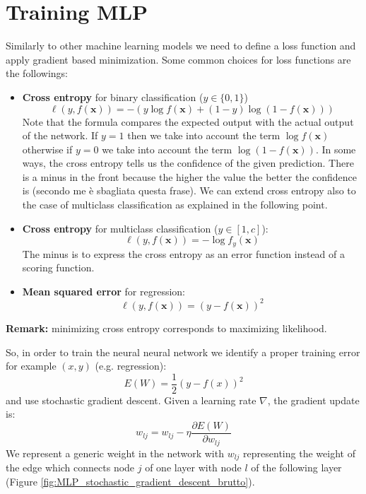 \section{Training MLP}
Similarly to other machine learning models we need to define a loss function and apply gradient based minimization. Some common choices for loss functions are the followings:
\begin{itemize}
    \item \textbf{Cross entropy} for binary classification ($y \in \{0,1\}$)
    \begin{equation}
        \ell(y,f(\pmb{x})) = -(y \log{f(\pmb{x})} + (1-y)\log{(1-f(\pmb{x}))})
    \end{equation}
    Note that the formula compares the expected output with the actual output of the network. If $y=1$ then we take into account the term $\log{f(\pmb{x})}$ otherwise if $y=0$ we take into account the term $\log{(1-f(\pmb{x}))}$. In some ways, the cross entropy tells us the confidence of the given prediction. There is a minus in the front because the higher the value the better the confidence is (secondo me è sbagliata questa frase). We can extend cross entropy also to the case of multiclass classification as explained in the following point.
    
    \item \textbf{Cross entropy} for multiclass classification ($y \in [1,c]$):
    \begin{equation}
        \ell(y, f(\pmb{x})) = -\log{f_y(\pmb{x})}
    \end{equation}
    The minus is to express the cross entropy as an error function instead of a scoring function.
    
    \item \textbf{Mean squared error} for regression:
    \begin{equation}
        \ell(y, f(\pmb{x})) = (y-f(\pmb{x}))^2
    \end{equation}
\end{itemize}
\textbf{Remark:} minimizing cross entropy corresponds to maximizing likelihood. \newline

So, in order to train the neural neural network we identify a proper training error for example $(x,y)$ (e.g. regression):
\begin{equation}
    E(W) = \frac{1}{2} (y - f(x))^2
\end{equation}
and use stochastic gradient descent. Given a learning rate $\nabla$, the gradient update is:
\begin{equation}
    w_{lj} = w_{lj} - \eta \frac{\partial E(W)}{\partial w_{lj}}
\end{equation}
We represent a generic weight in the network with $w_{lj}$ representing the weight of the edge which connects node $j$ of one layer with node $l$ of the following layer (Figure \ref{fig:MLP_stochastic_gradient_descent_brutto}).

